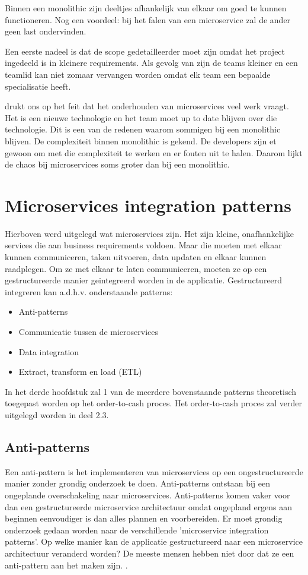 Binnen een monolithic zijn deeltjes afhankelijk van elkaar om goed te kunnen functioneren. Nog een voordeel: bij het falen van een microservice zal de ander geen last ondervinden. 

Een eerste nadeel is dat de scope gedetailleerder moet zijn omdat het project ingedeeld is in kleinere requirements. Als gevolg van zijn de teams kleiner en een teamlid kan niet zomaar vervangen worden omdat elk team een bepaalde specialisatie heeft.

\textcite{Koukia2018} drukt ons op het feit dat het onderhouden van microservices veel werk vraagt. Het is een nieuwe technologie en het team moet up to date blijven over die technologie. Dit is een van de redenen waarom sommigen bij een monolithic blijven. De complexiteit binnen monolithic is gekend. De developers zijn et gewoon om met die complexiteit te werken en er fouten uit te halen. Daarom lijkt de chaos bij microservices soms groter dan bij een monolithic.

\section{Microservices integration patterns}
Hierboven werd uitgelegd wat microservices zijn. Het zijn kleine, onafhankelijke services die aan business requirements voldoen. Maar die moeten met elkaar kunnen communiceren, taken uitvoeren, data updaten en elkaar kunnen raadplegen. Om ze met elkaar te laten communiceren, moeten ze op een gestructureerde manier geintegreerd worden in de applicatie. Gestructureerd integreren kan a.d.h.v. onderstaande patterns:
\begin{itemize}
	\item Anti-patterns
	\item Communicatie tussen de microservices
	\item Data integration
	\item Extract, transform en load (ETL)	
\end{itemize}

In het derde hoofdstuk zal 1 van de meerdere bovenstaande patterns theoretisch toegepast worden op het order-to-cash proces. Het order-to-cash proces zal verder uitgelegd worden in deel 2.3.
\subsection{Anti-patterns}
Een anti-pattern is het implementeren van microservices op een ongestructureerde manier zonder grondig onderzoek te doen. 
Anti-patterns ontstaan bij een ongeplande overschakeling naar microservices.  Anti-patterns komen vaker voor dan een gestructureerde microservice architectuur omdat ongepland ergens aan beginnen eenvoudiger is dan alles plannen en voorbereiden. Er moet grondig onderzoek gedaan worden naar de verschillende 'microservice integration patterns'. Op welke manier kan de applicatie gestructureerd naar een microservice architectuur veranderd worden?
De meeste mensen hebben niet door dat ze een anti-pattern aan het maken zijn. . 

